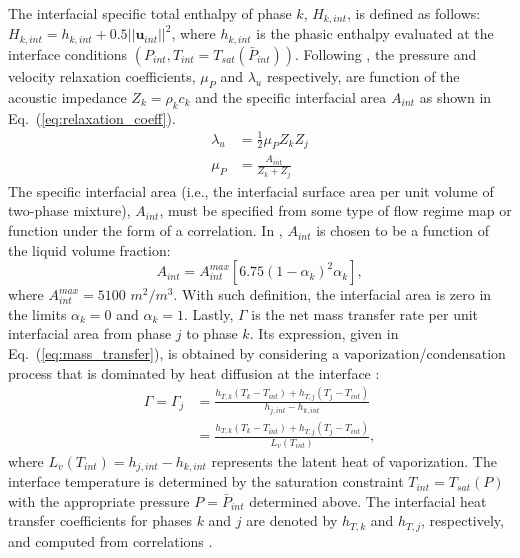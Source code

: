 \documentclass[preprint,10pt]{elsarticle}
\newcommand{\mbold}[1]{\boldsymbol#1}
\newcommand{\eqt}[1]{Eq.~(\ref{#1})}                     %
\begin{document}
%
The interfacial specific total enthalpy of phase $k$, $H_{k,int}$, is defined as follows: $H_{k,int} = h_{k,int} + 0.5 || \mbold u_{int} ||^2$, where $h_{k,int}$ is the phasic enthalpy evaluated at the interface conditions $(P_{int}, T_{int} = T_{sat}(\bar{P}_{int}))$. Following \cite{SEM}, the pressure and velocity relaxation coefficients, $\mu_P$  and $\lambda_u$ respectively, are function of the acoustic impedance $Z_k = \rho_k c_k$ and the specific interfacial area $A_{int}$ as shown in \eqt{eq:relaxation_coeff}.
%
\begin{subequations}
\label{eq:relaxation_coeff}
\begin{align}
  \label{E-R:85}
  \lambda_u &= \frac{1}{2} \mu_P Z_{k} Z_{j}
  \\
  \label{E-R:86}
  \mu_P &= \frac{A_{int}}{Z_{k}+Z_{j}}
\end{align}
\end{subequations}
%
The specific interfacial area (i.e., the interfacial surface area per unit
volume of two-phase mixture), $A_{int}$, must be specified from some type of
flow regime map or function under the form of a correlation. In \cite{SEM}, $A_{int}$ is chosen to be a function of the liquid volume fraction:
%
\begin{equation}\label{eq:Aint-sect4}
A_{int} = A_{int}^{max} \left[ 6.75 \left(1-\alpha_{k} \right)^2 \alpha_{k} \right],
\end{equation}
% 
where $A_{int}^{max} = 5100$ $m^2 / m^3$. With such definition, the interfacial area is zero in the limits $\alpha_{k} = 0$ and $\alpha_{k} = 1$. Lastly, $\Gamma$ is the net mass transfer rate per unit interfacial area from phase $j$ to phase $k$. Its expression, given in \eqt{eq:mass_transfer}, is obtained by considering a vaporization/condensation process that is dominated by heat diffusion at the interface \cite{SEM, BerryMarco_2014}:
%
\begin{align} \label{eq:mass_transfer}
  \nonumber
  \Gamma = \Gamma_{j}
  &= \frac{h_{T,  k} \left( T_{k} - T_{int} \right) + h_{T,  j} \left( T_{j} - T_{int} \right)}{h_{j,  int} - h_{k,  int}}
  \\
  &= \frac{h_{T,  k} \left( T_{k} - T_{int} \right) + h_{T,  j} \left( T_{j} - T_{int} \right)}{L_v \left( T_{int} \right)} ,
\end{align}
%
where $L_v \left( T_{int} \right) = h_{j,  int} - h_{k,  int}$
represents the latent heat of vaporization.  The interface
temperature is determined by the saturation constraint
$T_{int}=T_{sat}(P)$ with the appropriate pressure $P=\bar{P}_{int}$
determined above. The interfacial heat transfer coefficients for phases $k$ and $j$ are denoted by $h_{T,  k}$ and $h_{T,  j}$, respectively, and computed from correlations \cite{SEM}. 
\end{document}
